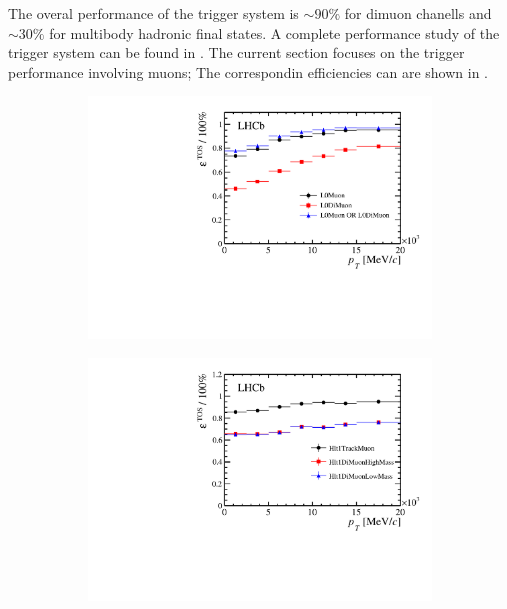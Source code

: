 The overal performance of the \lhcb trigger system is $\sim 90\%$ for dimuon chanells and $\sim 30\%$ for
multibody hadronic final states. A complete performance study of the trigger system can be found in \cite{}.
The current section focuses on the trigger performance involving muons; The correspondin efficiencies can
are shown in \figref{}.


\begin{figure}[t]
  \centering
  \begin{subfigure}{0.5\textwidth}
    \raggedright
    \includegraphics[width=\textwidth,trim=0.45cm 0cm 0.4cm 0cm, clip=true]{Figures/Chapter2/l0_muon_eff}
    \caption{}
    \label{run_one_l0_muon_line_eff}
  \end{subfigure}%
  \begin{subfigure}{0.5\textwidth}
    \raggedleft
    \includegraphics[width=\textwidth,trim=0.45cm 0cm 0.4cm 0cm, clip=true]{Figures/Chapter2/hlt1_muon_eff}

\end{subfigure}
\end{figure}
